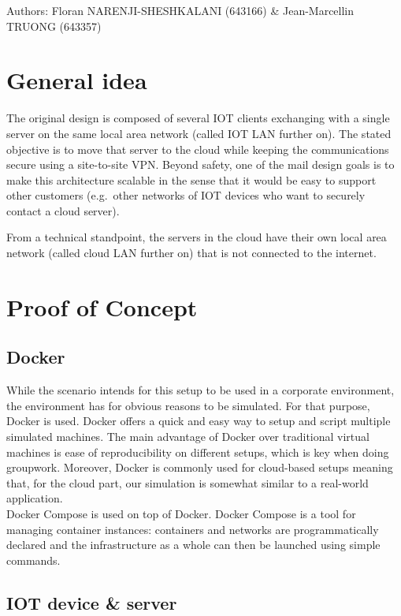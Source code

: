 \documentclass[paper=a4, fontsize=11pt]{scrartcl}
\author{Floran NARENJI-SHESHKALANI \& Jean-Marcellin TRUONG}
\begin{document}
Authors: Floran NARENJI-SHESHKALANI (643166) \& Jean-Marcellin TRUONG (643357)

\section{General idea}

The original design is composed of several IOT clients exchanging with a single
server on the same local area network (called IOT LAN further on).
The stated objective is to move that server to the cloud while keeping the
communications secure using a site-to-site VPN\@.
Beyond safety, one of the mail design goals is to make this architecture
scalable in the sense that it would be easy to support other customers (e.g.\
other networks of IOT devices who want to securely contact a cloud server).

From a technical standpoint, the servers in the cloud have their own local area
network (called cloud LAN further on) that is not connected to the internet.

\section{Proof of Concept}

\subsection{Docker}

While the scenario intends for this setup to be used in a corporate environment,
the environment has for obvious reasons to be simulated.
For that purpose, Docker is used. Docker offers a quick and easy way to setup
and script multiple simulated machines.
The main advantage of Docker over traditional virtual machines is ease of
reproducibility on different setups, which is key when doing groupwork.
Moreover, Docker is commonly used for cloud-based setups meaning that, for the
cloud part, our simulation is somewhat similar to a real-world application.
\\

Docker Compose is used on top of Docker. Docker Compose is a tool for managing
container instances: containers and networks are programmatically declared and
the infrastructure as a whole can then be launched using simple commands.

\subsection{IOT device \& server}
\end{document}
